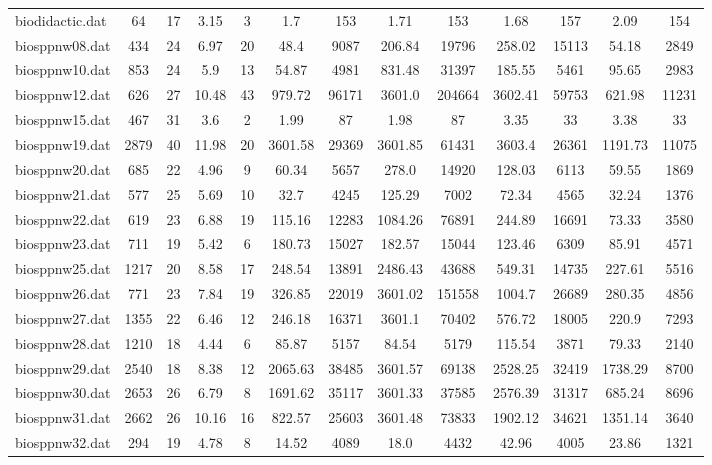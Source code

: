 \begin{table}[!ht]
{\begin{tabular}{lcccccccccccc}
biodidactic.dat & 64 & 17 & 3.15 & 3 & 1.7 & 153 & 1.71 & 153 & 1.68 & 157 & 2.09 & 154 \\
biosppnw08.dat & 434 & 24 & 6.97 & 20 & 48.4 & 9087 & 206.84 & 19796 & 258.02 & 15113 & 54.18 & 2849 \\
biosppnw10.dat & 853 & 24 & 5.9 & 13 & 54.87 & 4981 & 831.48 & 31397 & 185.55 & 5461 & 95.65 & 2983 \\
biosppnw12.dat & 626 & 27 & 10.48 & 43 & 979.72 & 96171 & 3601.0 & 204664 & 3602.41 & 59753 & 621.98 & 11231 \\
biosppnw15.dat & 467 & 31 & 3.6 & 2 & 1.99 & 87 & 1.98 & 87 & 3.35 & 33 & 3.38 & 33 \\
biosppnw19.dat & 2879 & 40 & 11.98 & 20 & 3601.58 & 29369 & 3601.85 & 61431 & 3603.4 & 26361 & 1191.73 & 11075 \\
biosppnw20.dat & 685 & 22 & 4.96 & 9 & 60.34 & 5657 & 278.0 & 14920 & 128.03 & 6113 & 59.55 & 1869 \\
biosppnw21.dat & 577 & 25 & 5.69 & 10 & 32.7 & 4245 & 125.29 & 7002 & 72.34 & 4565 & 32.24 & 1376 \\
biosppnw22.dat & 619 & 23 & 6.88 & 19 & 115.16 & 12283 & 1084.26 & 76891 & 244.89 & 16691 & 73.33 & 3580 \\
biosppnw23.dat & 711 & 19 & 5.42 & 6 & 180.73 & 15027 & 182.57 & 15044 & 123.46 & 6309 & 85.91 & 4571 \\
biosppnw25.dat & 1217 & 20 & 8.58 & 17 & 248.54 & 13891 & 2486.43 & 43688 & 549.31 & 14735 & 227.61 & 5516 \\
biosppnw26.dat & 771 & 23 & 7.84 & 19 & 326.85 & 22019 & 3601.02 & 151558 & 1004.7 & 26689 & 280.35 & 4856 \\
biosppnw27.dat & 1355 & 22 & 6.46 & 12 & 246.18 & 16371 & 3601.1 & 70402 & 576.72 & 18005 & 220.9 & 7293 \\
biosppnw28.dat & 1210 & 18 & 4.44 & 6 & 85.87 & 5157 & 84.54 & 5179 & 115.54 & 3871 & 79.33 & 2140 \\
biosppnw29.dat & 2540 & 18 & 8.38 & 12 & 2065.63 & 38485 & 3601.57 & 69138 & 2528.25 & 32419 & 1738.29 & 8700 \\
biosppnw30.dat & 2653 & 26 & 6.79 & 8 & 1691.62 & 35117 & 3601.33 & 37585 & 2576.39 & 31317 & 685.24 & 8696 \\
biosppnw31.dat & 2662 & 26 & 10.16 & 16 & 822.57 & 25603 & 3601.48 & 73833 & 1902.12 & 34621 & 1351.14 & 3640 \\
biosppnw32.dat & 294 & 19 & 4.78 & 8 & 14.52 & 4089 & 18.0 & 4432 & 42.96 & 4005 & 23.86 & 1321 \\

\end{tabular}}
\end{table}

